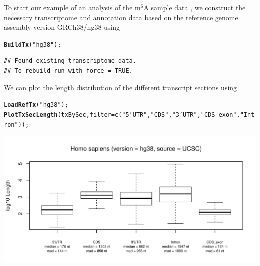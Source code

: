 \documentclass[a4paper,11pt]{article}\usepackage[]{graphicx}\usepackage[]{color}
\makeatletter
\def\maxwidth{ %
  \ifdim\Gin@nat@width>\linewidth
    \linewidth
  \else
    \Gin@nat@width
  \fi
}
\newcommand{\hlstr}[1]{\textcolor[rgb]{0.192,0.494,0.8}{#1}}%
\newcommand{\hlstd}[1]{\textcolor[rgb]{0.345,0.345,0.345}{#1}}%
\newcommand{\hlkwc}[1]{\textcolor[rgb]{0.333,0.667,0.333}{#1}}%
\newcommand{\hlkwd}[1]{\textcolor[rgb]{0.737,0.353,0.396}{\textbf{#1}}}%
\newenvironment{kframe}{%
 \def\at@end@of@kframe{}%
 \ifinner\ifhmode%
  \def\at@end@of@kframe{\end{minipage}}%
  \begin{minipage}{\columnwidth}%
 \fi\fi%
 \def\FrameCommand##1{\hskip\@totalleftmargin \hskip-\fboxsep
 \colorbox{shadecolor}{##1}\hskip-\fboxsep
     \hskip-\linewidth \hskip-\@totalleftmargin \hskip\columnwidth}%
 \MakeFramed {\advance\hsize-\width
   \@totalleftmargin\z@ \linewidth\hsize
   \@setminipage}}%
 {\par\unskip\endMakeFramed%
 \at@end@of@kframe}
\newenvironment{knitrout}{}{} %
\makeatother
\begin{document}
To start our example of an analysis of the m$^{6}$A sample data \cite{Linder}, we construct the necessary transcriptome and annotation data based on the reference genome assembly version GRCh38/hg38 using
\begin{knitrout}
\color{fgcolor}\begin{kframe}
\begin{alltt}
\hlkwd{BuildTx}\hlstd{(}\hlstr{"hg38"}\hlstd{);}
\end{alltt}
\begin{verbatim}
## Found existing transcriptome data.
## To rebuild run with force = TRUE.
\end{verbatim}
\end{kframe}
\end{knitrout}

We can plot the length distribution of the different transcript sections using
\begin{knitrout}
\color{fgcolor}\begin{kframe}
\begin{alltt}
\hlkwd{LoadRefTx}\hlstd{(}\hlstr{"hg38"}\hlstd{);}
\hlkwd{PlotTxSecLength}\hlstd{(txBySec,} \hlkwc{filter} \hlstd{=} \hlkwd{c}\hlstd{(}\hlstr{"5'UTR"}\hlstd{,} \hlstr{"CDS"}\hlstd{,} \hlstr{"3'UTR"}\hlstd{,} \hlstr{"CDS_exon"}\hlstd{,} \hlstr{"Intron"}\hlstd{));}
\end{alltt}
\end{kframe}
\includegraphics[width=\maxwidth]{figure/unnamed-chunk-3-1} 

\end{knitrout}
\end{document}
